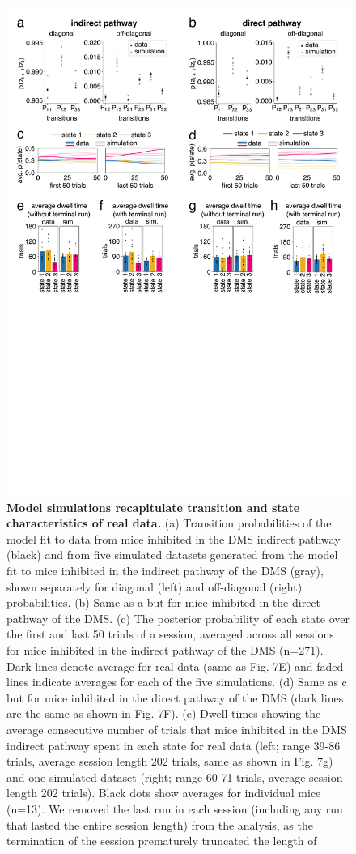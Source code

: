 \begin{figure}[t!]
\vspace{-0.2cm}
  \begin{center}
    \includegraphics[width=0.90\linewidth]{ch7-appendix1/appendix1-figures/ExtData_Fig9.pdf}
    \caption[Model simulations recapitulate transition and state characteristics of real data]{\textbf{Model simulations recapitulate transition and state characteristics of real data.} (a) Transition probabilities of the model fit to data from mice inhibited in the DMS indirect pathway (black) and from five simulated datasets generated from the model fit to mice inhibited in the indirect pathway of the DMS (gray), shown separately for diagonal (left) and off-diagonal (right) probabilities. (b) Same as a but for mice inhibited in the direct pathway of the DMS. (c) The posterior probability of each state over the first and last 50 trials of a session, averaged across all sessions for mice inhibited in the indirect pathway of the DMS (n=271). Dark lines denote average for real data (same as Fig. 7E) and faded lines indicate averages for each of the five simulations. (d) Same as c but for mice inhibited in the direct pathway of the DMS (dark lines are the same as shown in Fig. 7F). (e) Dwell times showing the average consecutive number of trials that mice inhibited in the DMS indirect pathway spent in each state for real data (left; range 39-86 trials, average session length 202 trials, same as shown in Fig. 7g) and one simulated dataset (right; range 60-71 trials, average session length 202 trials). Black dots show averages for individual mice (n=13). We removed the last run in each session (including any run that lasted the entire session length) from the analysis, as the termination of the session prematurely truncated the length of }

\end{center}
\end{figure}
